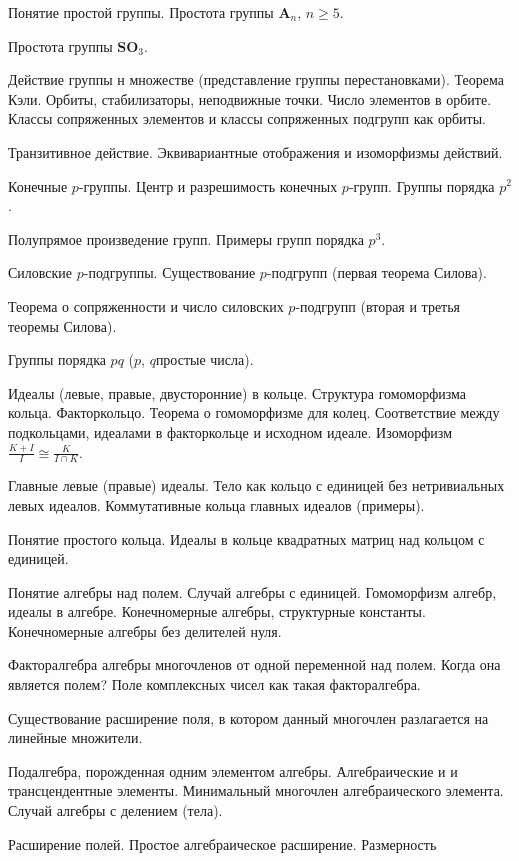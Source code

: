 \documentclass[a4paper]{article}
\begin{document}
\begin{nums}{-1}
Понятие простой группы. Простота группы $\mathbf{A}_n$, $n\ge 5$.
\item
Простота группы $\mathbf{SO}_3$.
\item
Действие группы н множестве (представление группы перестановками).
Теорема Кэли. Орбиты, стабилизаторы, неподвижные точки. Число
элементов в орбите. Классы сопряженных элементов и классы
сопряженных подгрупп как орбиты.
\item
Транзитивное действие. Эквивариантные отображения и изоморфизмы действий.
\item
Конечные $p$-группы. Центр и разрешимость конечных $p$-групп.
Группы порядка $p^2$.
\item
Полупрямое произведение групп. Примеры групп порядка $p^3$.
\item
Силовские $p$-подгруппы. Существование $p$-подгрупп (первая
теорема Силова).
\item
Теорема о сопряженности и число силовских $p$-подгрупп (вторая и
третья теоремы Силова).
\item
Группы порядка $pq$ ($p$, $q$\т простые числа).
\item
Идеалы (левые, правые, двусторонние) в кольце. Структура
гомоморфизма кольца. Факторкольцо. Теорема о гомоморфизме для
колец. Соответствие между подкольцами, идеалами в факторкольце и
исходном идеале. Изоморфизм $\frac{K+I}{I}\cong \frac{K}{I\cap
K}$.
\item
Главные левые (правые) идеалы. Тело как кольцо с единицей без
нетривиальных левых идеалов. Коммутативные кольца главных идеалов
(примеры).
\item
Понятие простого кольца. Идеалы в кольце квадратных матриц над
кольцом с единицей.
\item
Понятие алгебры над полем. Случай алгебры с единицей. Гомоморфизм
алгебр, идеалы в алгебре. Конечномерные алгебры, структурные
константы. Конечномерные алгебры без делителей нуля.
\item
Факторалгебра алгебры многочленов от одной переменной над полем.
Когда она является полем? Поле комплексных чисел как такая
факторалгебра.
\item
Существование расширение поля, в котором данный многочлен
разлагается на линейные множители.
\item
Подалгебра, порожденная одним элементом алгебры. Алгебраические и
и трансцендентные элементы. Минимальный многочлен алгебраического
элемента. Случай алгебры с делением (тела).
\item
Расширение полей. Простое алгебраическое расширение. Размерность

\end{nums}
\end{document}
